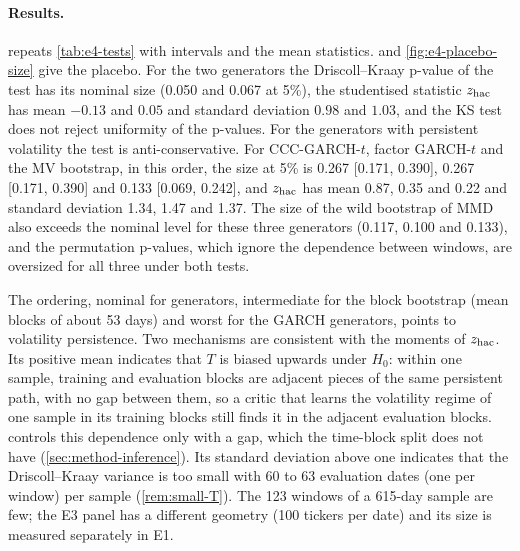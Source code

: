 \paragraph{Results.}
 repeats \cref{tab:e4-tests} with intervals and the mean statistics.
 and
\cref{fig:e4-placebo-size} give the placebo. For the two \iid{} generators the Driscoll--Kraay
p-value of the \WC{} test has its nominal size (0.050 and 0.067 at 5\%), the studentised
statistic $z_{\mathrm{hac}}$ has mean $-0.13$ and $0.05$ and standard deviation $0.98$ and $1.03$, and the KS
test does not reject uniformity of the p-values. For the generators with persistent volatility
the test is anti-conservative. For CCC-GARCH-$t$, factor GARCH-$t$ and the MV bootstrap, in this
order, the size at 5\% is 0.267 [0.171, 0.390], 0.267 [0.171, 0.390] and 0.133 [0.069, 0.242], and
$z_{\mathrm{hac}}$ has mean 0.87, 0.35 and 0.22 and standard deviation 1.34, 1.47 and 1.37. The size of the
wild bootstrap of MMD also exceeds the nominal level for these three generators (0.117, 0.100 and
0.133), and the permutation p-values, which ignore the dependence between windows, are oversized
for all three under both tests.

The ordering, nominal for \iid{} generators, intermediate for the block bootstrap (mean blocks of
about 53 days) and worst for the GARCH generators, points to volatility persistence. Two
mechanisms are consistent with the moments of $z_{\mathrm{hac}}$. Its positive mean indicates that $T$ is
biased upwards under $H_0$: within one sample, training and evaluation blocks are adjacent pieces
of the same persistent path, with no gap between them, so a critic that learns the volatility
regime of one sample in its training blocks still finds it in the adjacent evaluation blocks.
 controls this dependence only with a gap, which the time-block split does
not have (\cref{sec:method-inference}). Its standard deviation above one indicates that the
Driscoll--Kraay variance is too small with 60 to 63 evaluation dates (one per window) per
sample (\cref{rem:small-T}). The 123 windows of a 615-day sample are few; the E3 panel has a different
geometry (100 tickers per date) and its size is measured separately in E1.

